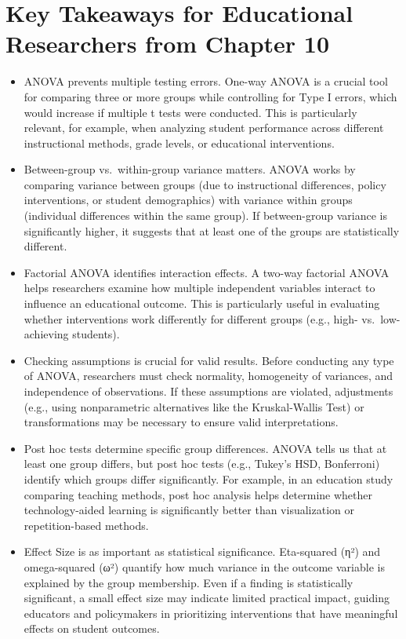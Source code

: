 \documentclass[
  letterpaper,
  DIV=11,
  numbers=noendperiod]{scrreprt}
\begin{document}
\section*{Key Takeaways for Educational Researchers from Chapter
10}\label{key-takeaways-for-educational-researchers-from-chapter-10}


\begin{itemize}
\item
  ANOVA prevents multiple testing errors. One-way ANOVA is a crucial
  tool for comparing three or more groups while controlling for Type I
  errors, which would increase if multiple t tests were conducted. This
  is particularly relevant, for example, when analyzing student
  performance across different instructional methods, grade levels, or
  educational interventions.
\item
  Between-group vs.~within-group variance matters. ANOVA works by
  comparing variance between groups (due to instructional differences,
  policy interventions, or student demographics) with variance within
  groups (individual differences within the same group). If
  between-group variance is significantly higher, it suggests that at
  least one of the groups are statistically different.
\item
  Factorial ANOVA identifies interaction effects. A two-way factorial
  ANOVA helps researchers examine how multiple independent variables
  interact to influence an educational outcome. This is particularly
  useful in evaluating whether interventions work differently for
  different groups (e.g., high- vs.~low-achieving students).
\item
  Checking assumptions is crucial for valid results. Before conducting
  any type of ANOVA, researchers must check normality, homogeneity of
  variances, and independence of observations. If these assumptions are
  violated, adjustments (e.g., using nonparametric alternatives like the
  Kruskal-Wallis Test) or transformations may be necessary to ensure
  valid interpretations.
\item
  Post hoc tests determine specific group differences. ANOVA tells us
  that at least one group differs, but post hoc tests (e.g., Tukey's
  HSD, Bonferroni) identify which groups differ significantly. For
  example, in an education study comparing teaching methods, post hoc
  analysis helps determine whether technology-aided learning is
  significantly better than visualization or repetition-based methods.
\item
  Effect Size is as important as statistical significance. Eta-squared
  (η²) and omega-squared (ω²) quantify how much variance in the outcome
  variable is explained by the group membership. Even if a finding is
  statistically significant, a small effect size may indicate limited
  practical impact, guiding educators and policymakers in prioritizing
  interventions that have meaningful effects on student outcomes.
\end{itemize}
\end{document}
